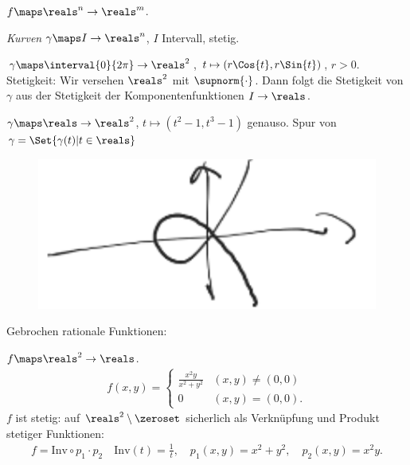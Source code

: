 \begin{beispiele}
    \( f\maps \reals^n\to \reals^m \).
    \begin{eigenschaftenenumerate}
        \item \emph{Kurven} \( \gamma\maps I\to \reals^n \), \( I \) Intervall, stetig.
        \begin{beispiele*}
            \item \( \gamma\maps \interval{0}{2\pi}\to \reals^2 \), \( t\mapsto (r \Cos{t}, r \Sin{t}) \), \( r>0 \).
            Stetigkeit: Wir versehen \( \reals^2 \) mit \( \supnorm{\cdot} \).
            Dann folgt die Stetigkeit von \( \gamma \) aus der Stetigkeit der Komponentenfunktionen \( I\to \reals \).
            \item \( \gamma\maps \reals\to \reals^2 \), \( t\mapsto (t^2-1,t^3-1) \) genauso.
            Spur von \( \gamma=\Set{\gamma(t)|t\in \reals} \)
            \begin{figure}[H]
                \centering
                \includegraphics[width=0.5\linewidth]{figures/komponentenstetigkeit_beispiel_hoch_2_gegen_hoch_3}
                \label{fig:komponentenstetigkeit_beispiel_hoch_2_gegen_hoch_3}
            \end{figure}
        \end{beispiele*}
        \item\label{stetigkeit:beispiel:gebrochen_rationale_funktionen} Gebrochen rationale Funktionen:
        \begin{beispiele*}
            \item \( f\maps \reals^2\to \reals \).
            \begin{align*}
                f(x,y)=\begin{cases}
                    \frac{x^2y}{x^2+y^2}&(x,y)\neq (0,0)\\
                    0&(x,y)=(0,0).
                \end{cases}                
            \end{align*}
            \( f \) ist stetig: auf \( \reals^2\setminus \zeroset \) sicherlich als Verknüpfung und Produkt stetiger Funktionen:
            \begin{align*}
                f=\text{Inv}\circ p_1\cdot p_2\quad \text{Inv}(t)=\frac{1}{t},\quad p_1(x,y)=x^2+y^2,\quad p_2(x,y)=x^2y.

\end{align*}
\end{beispiele*}
\end{eigenschaftenenumerate}
\end{beispiele}
